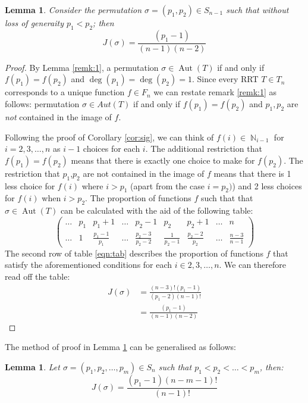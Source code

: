 \documentclass[oneside]{book} %
\newtheorem{lem}[thm]{Lemma}
\theoremstyle{definition}
\numberwithin{equation}{section}
\DeclareMathOperator{\Aut}{Aut} %
\DeclareMathOperator{\N}{\mathbb{N}}
\begin{document}
\begin{lem}\label{lem:2cycle}
 Consider the permutation $\sigma = (p_1,p_2) \in S_{n-1}$ such that without loss of generaity $p_1 < p_2$; then
 \[
  J(\sigma) = \frac{(p_1-1)}{(n-1)(n-2)}
 \]
\end{lem}
\begin{proof}
 By Lemma \ref{remk:1}, a permutation $\sigma \in \Aut(T)$ if and only if $f(p_1) = f(p_2)$ and $\deg(p_1) = \deg(p_2) = 1$.  Since every RRT $T \in T_n$ corresponds to a unique function $f \in F_n$ we can restate remark \ref{remk:1} as follows:  permutation $\sigma \in Aut(T)$ if and only if $f(p_1) = f(p_2)$ and $p_1,p_2$ are \emph{not} contained in the image of $f$. 
 
Following the proof of Corollary \ref{cor:sig}, we can think of $f(i) \in \N_{i-1}$ for $i = 2,3,\dots,n$  as $i-1$ choices for each $i$.  The additional restriction that $f(p_1) = f(p_2)$ means that there is exactly one choice to make for $f(p_2)$.  The restriction that $p_1$,$p_2$ are not contained in the image of $f$ means that there is 1 less choice for $f(i)$ where $i >p_1$ (apart from the case $i=p_2)$) and 2 less choices for $f(i)$ when $i >p_2$.  The proportion of functions $f$ such that  that $\sigma \in \Aut(T)$ can be calculated with the aid of the following table:
 \begin{equation}\label{eqn:tab}  \left(\begin{array}{ccccccccc}
       \dots & p_1 & p_1 +1            & \dots & p_2-1               & p_2              & p_2+1               &\dots  & n \\
       \dots & 1   & \frac{p_1-1}{p_1} & \dots & \frac{p_2-3}{p_2-2} & \frac{1}{p_2 -1} & \frac{p_2 - 2}{p_2} & \dots & \frac{n-3}{n-1}
    \end{array} \right)
\end{equation}
      The second row of table \ref{eqn:tab} describes the proportion of functions $f$ that satisfy the aforementioned conditions for each $i \in 2,3,\dots, n$.  We can therefore read off the table:
 \begin{align}
 J(\sigma) &= \frac{(n-3)!(p_1-1)}{(p_1 - 2)(n-1)!}\\
 &= \frac{(p_1-1)}{(n-1)(n-2)}
 \end{align}
\end{proof}
The method of proof in Lemma \ref{lem:2cycle} can be generalised as follows:
\begin{lem}\label{lem:3cycle}
 Let $\sigma = (p_1,p_2,\dots,p_m) \in S_n$ such that $p_1 < p_2< \dots <p_m$, then:
 \[
 J(\sigma) = \frac{(p_1-1)(n-m-1)!}{(n-1)!}
 \]
\end{lem}
\end{document}
